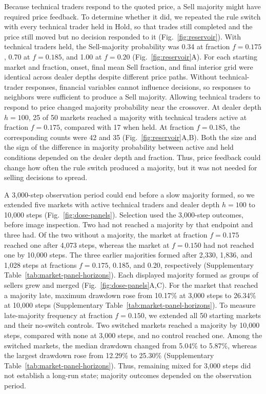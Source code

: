 Because technical traders respond to the quoted price, a Sell majority
might have required price feedback. To determine whether it did, we
repeated the rule switch with every technical trader held in Hold, so
that trades still completed and the price still moved but no decision
responded to it (Fig.~\ref{fig:reservoir}).
With technical traders held, the Sell-majority probability was
0.34 at fraction $f=0.175$, 0.70 at $f=0.185$, and
1.00 at $f=0.20$ (Fig.~\ref{fig:reservoir}A). For each
starting market and fraction, onset, final mean Sell fraction, and final
interior grid were identical across dealer depths despite different price
paths. Without technical-trader responses, financial variables cannot influence decisions,
so responses to neighbors were sufficient to produce a Sell majority.
Allowing technical traders to respond to price changed majority probability
near the crossover. At dealer depth $h=100$, 25 of 50 markets reached a majority
with technical traders active at fraction $f=0.175$, compared with 17
when held. At fraction $f=0.185$, the corresponding counts were 42 and 35 (Fig.~\ref{fig:reservoir}A,B).
Both the size and the sign of the difference in majority probability between active and held conditions depended
on the dealer depth and fraction. Thus, price feedback could change how
often the rule switch produced a majority, but it was not needed for
selling decisions to spread.



A 3,000-step observation period could end before a slow majority formed,
so we extended five markets with active technical traders and dealer
depth $h=100$ to 10,000 steps (Fig.~\ref{fig:dose-panels}). Selection used the
3,000-step outcomes, before image inspection. Two had not reached a
majority by that endpoint and three had. Of the two without a majority,
the market at fraction $f=0.175$ reached one after 4{,}073 steps, whereas
the market at $f=0.150$ had not reached one by 10,000 steps. The three
earlier majorities formed after 2{,}330, 1{,}836, and 1{,}028 steps
at fractions $f=0.175$, 0.185, and 0.20, respectively (Supplementary Table~\ref{tab:market-panel-horizons}). Each
displayed majority formed as groups of sellers grew and merged (Fig.~\ref{fig:dose-panels}A,C). For the market that reached a majority late,
maximum drawdown rose from 10.17\% at 3,000 steps to 26.34\% at
10,000 steps (Supplementary Table~\ref{tab:market-panel-horizons}). To measure late-majority
frequency at fraction
$f=0.150$, we extended all 50 starting markets
and their no-switch controls. Two switched markets
reached a majority by 10,000 steps, compared with none at 3,000 steps,
and no control reached one. Among the switched markets, the median
drawdown changed from 5.04\% to 5.87\%, whereas the largest
drawdown rose from 12.29\% to 25.30\%
(Supplementary Table~\ref{tab:market-panel-horizons}). Thus, remaining mixed
for 3,000 steps did not establish a long-run state; majority outcomes
depended on the observation period.

